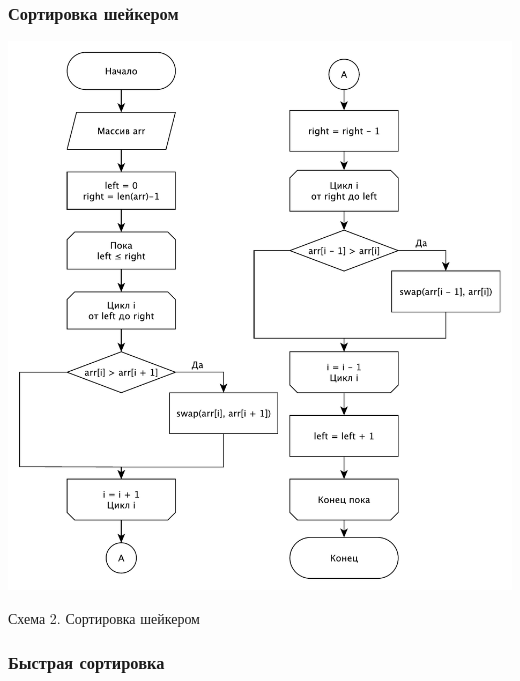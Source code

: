 \documentclass[a4paper,12pt]{article}
\begin{document}
\subsubsection{Сортировка шейкером}

\begin{center}
    \includegraphics[scale=0.5]{Shaker}

    Схема 2. Сортировка шейкером
\end{center}

\subsubsection{Быстрая сортировка}
\end{document}
